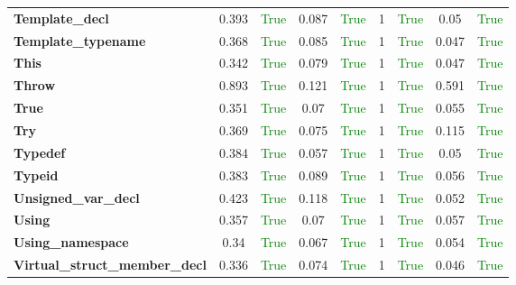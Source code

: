 \documentclass{article}
\begin{document}
\begin{xltabular}{\textwidth}{lcccccccc}
\textbf{{\fontsize{10}{12}\selectfont Template\_decl}}& 0.393&\textcolor{green}{True}& 0.087&\textcolor{green}{True}& 1&\textcolor{green}{True}& 0.05&\textcolor{green}{True} \\[0.5ex]
\textbf{{\fontsize{10}{12}\selectfont Template\_typename}}& 0.368&\textcolor{green}{True}& 0.085&\textcolor{green}{True}& 1&\textcolor{green}{True}& 0.047&\textcolor{green}{True} \\[0.5ex]
\textbf{{\fontsize{10}{12}\selectfont This}}& 0.342&\textcolor{green}{True}& 0.079&\textcolor{green}{True}& 1&\textcolor{green}{True}& 0.047&\textcolor{green}{True} \\[0.5ex]
\textbf{{\fontsize{10}{12}\selectfont Throw}}& 0.893&\textcolor{green}{True}& 0.121&\textcolor{green}{True}& 1&\textcolor{green}{True}& 0.591&\textcolor{green}{True} \\[0.5ex]
\textbf{{\fontsize{10}{12}\selectfont True}}& 0.351&\textcolor{green}{True}& 0.07&\textcolor{green}{True}& 1&\textcolor{green}{True}& 0.055&\textcolor{green}{True} \\[0.5ex]
\textbf{{\fontsize{10}{12}\selectfont Try}}& 0.369&\textcolor{green}{True}& 0.075&\textcolor{green}{True}& 1&\textcolor{green}{True}& 0.115&\textcolor{green}{True} \\[0.5ex]
\textbf{{\fontsize{10}{12}\selectfont Typedef}}& 0.384&\textcolor{green}{True}& 0.057&\textcolor{green}{True}& 1&\textcolor{green}{True}& 0.05&\textcolor{green}{True} \\[0.5ex]
\textbf{{\fontsize{10}{12}\selectfont Typeid}}& 0.383&\textcolor{green}{True}& 0.089&\textcolor{green}{True}& 1&\textcolor{green}{True}& 0.056&\textcolor{green}{True} \\[0.5ex]
\textbf{{\fontsize{10}{12}\selectfont Unsigned\_var\_decl}}& 0.423&\textcolor{green}{True}& 0.118&\textcolor{green}{True}& 1&\textcolor{green}{True}& 0.052&\textcolor{green}{True} \\[0.5ex]
\textbf{{\fontsize{10}{12}\selectfont Using}}& 0.357&\textcolor{green}{True}& 0.07&\textcolor{green}{True}& 1&\textcolor{green}{True}& 0.057&\textcolor{green}{True} \\[0.5ex]
\textbf{{\fontsize{10}{12}\selectfont Using\_namespace}}& 0.34&\textcolor{green}{True}& 0.067&\textcolor{green}{True}& 1&\textcolor{green}{True}& 0.054&\textcolor{green}{True} \\[0.5ex]
\textbf{{\fontsize{10}{12}\selectfont Virtual\_struct\_member\_decl}}& 0.336&\textcolor{green}{True}& 0.074&\textcolor{green}{True}& 1&\textcolor{green}{True}& 0.046&\textcolor{green}{True} \\[0.5ex]

\end{xltabular}
\end{document}
